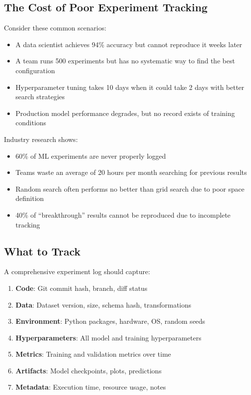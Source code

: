 \subsection{The Cost of Poor Experiment Tracking}

Consider these common scenarios:

\begin{itemize}
    \item A data scientist achieves 94\% accuracy but cannot reproduce it weeks later
    \item A team runs 500 experiments but has no systematic way to find the best configuration
    \item Hyperparameter tuning takes 10 days when it could take 2 days with better search strategies
    \item Production model performance degrades, but no record exists of training conditions
\end{itemize}

Industry research shows:
\begin{itemize}
    \item 60\% of ML experiments are never properly logged
    \item Teams waste an average of 20 hours per month searching for previous results
    \item Random search often performs no better than grid search due to poor space definition
    \item 40\% of ``breakthrough'' results cannot be reproduced due to incomplete tracking
\end{itemize}

\subsection{What to Track}

A comprehensive experiment log should capture:

\begin{enumerate}
    \item \textbf{Code}: Git commit hash, branch, diff status
    \item \textbf{Data}: Dataset version, size, schema hash, transformations
    \item \textbf{Environment}: Python packages, hardware, OS, random seeds
    \item \textbf{Hyperparameters}: All model and training hyperparameters
    \item \textbf{Metrics}: Training and validation metrics over time
    \item \textbf{Artifacts}: Model checkpoints, plots, predictions
    \item \textbf{Metadata}: Execution time, resource usage, notes
\end{enumerate}

